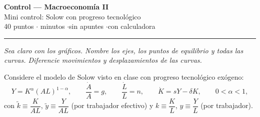 \documentclass[11pt]{article}
\begin{document}
\begin{center}
{\Large\bfseries Control --- Macroeconomía II}\\[4pt]
{\large Mini control: Solow con progreso tecnológico}\\[4pt]
40 puntos \quad$\cdot$ minutos \quad$\cdot$\quad sin apuntes \quad$\cdot$\quad con calculadora
\end{center}

\hrule
\medskip

\textit{Sea claro con los gráficos. Nombre los ejes, los puntos de equilibrio y todas las curvas. Diferencie movimientos y desplazamientos de las curvas.}

Considere el modelo de Solow visto en clase con progreso tecnológico exógeno:
\[
Y = K^{\alpha}(AL)^{1-\alpha}, \qquad \frac{\dot A}{A} = g, \qquad \frac{\dot L}{L} = n, \qquad \dot K = sY - \delta K, \qquad 0<\alpha<1,
\]
con $\tilde k \equiv \dfrac{K}{AL}$, $\tilde y \equiv \dfrac{Y}{AL}$ (por trabajador efectivo) y $k \equiv \dfrac{K}{L}$, $y \equiv \dfrac{Y}{L}$ (por trabajador).
\end{document}
